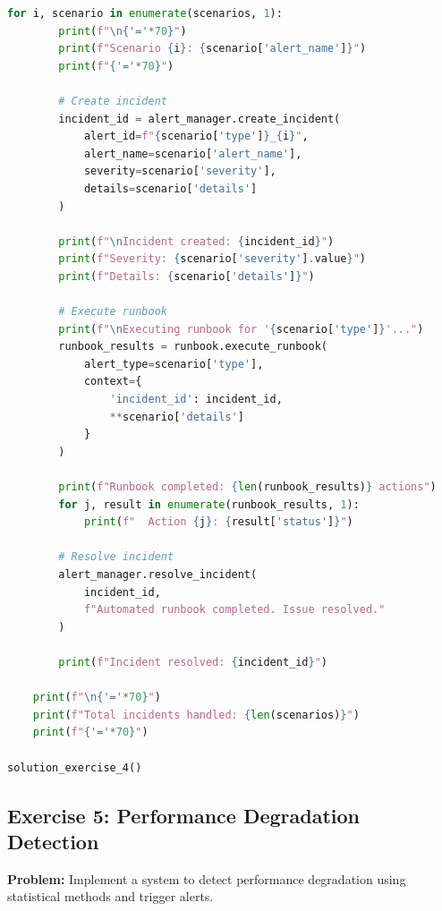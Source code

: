 \begin{lstlisting}[language=Python]
    for i, scenario in enumerate(scenarios, 1):
        print(f"\n{'='*70}")
        print(f"Scenario {i}: {scenario['alert_name']}")
        print(f"{'='*70}")

        # Create incident
        incident_id = alert_manager.create_incident(
            alert_id=f"{scenario['type']}_{i}",
            alert_name=scenario['alert_name'],
            severity=scenario['severity'],
            details=scenario['details']
        )

        print(f"\nIncident created: {incident_id}")
        print(f"Severity: {scenario['severity'].value}")
        print(f"Details: {scenario['details']}")

        # Execute runbook
        print(f"\nExecuting runbook for '{scenario['type']}'...")
        runbook_results = runbook.execute_runbook(
            alert_type=scenario['type'],
            context={
                'incident_id': incident_id,
                **scenario['details']
            }
        )

        print(f"Runbook completed: {len(runbook_results)} actions")
        for j, result in enumerate(runbook_results, 1):
            print(f"  Action {j}: {result['status']}")

        # Resolve incident
        alert_manager.resolve_incident(
            incident_id,
            f"Automated runbook completed. Issue resolved."
        )

        print(f"Incident resolved: {incident_id}")

    print(f"\n{'='*70}")
    print(f"Total incidents handled: {len(scenarios)}")
    print(f"{'='*70}")

solution_exercise_4()
\end{lstlisting}

\subsection{Exercise 5: Performance Degradation Detection}

\textbf{Problem:} Implement a system to detect performance degradation using statistical methods and trigger alerts.

